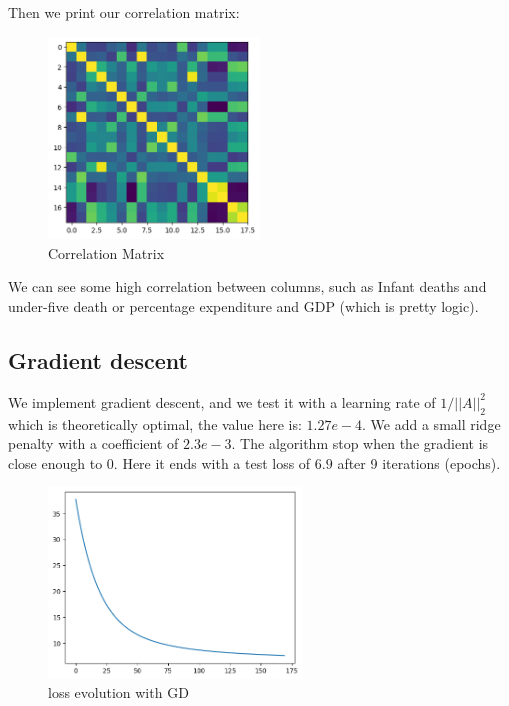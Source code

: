\documentclass{article}
\begin{document}
    Then we print our correlation matrix: 

    \begin{figure}[!h]
    \centering
    \includegraphics[width=0.5\textwidth]{images/corr.png}
    \caption{Correlation Matrix}
    \label{fig:res}
    \end{figure}

    \newpage

    We can see some high correlation between columns, such as Infant deaths and under-five death or percentage expenditure and GDP (which is pretty logic).

\subsection{Gradient descent}
    We implement gradient descent, and we test it with a learning rate of $1/||A||_{2}^2$ which is theoretically optimal, the value here is: $1.27e-4$. We add a small ridge penalty with a coefficient of $2.3e-3$. The algorithm stop when the gradient is close enough to 0. Here it ends with a test loss of $6.9$ after 9 iterations (epochs).

    \begin{figure}[!h]
    \centering
    \includegraphics[width=0.6\textwidth]{images/loss1.png}
    \caption{loss evolution with GD}
    \label{fig:loss1}
    \end{figure}
\end{document}
